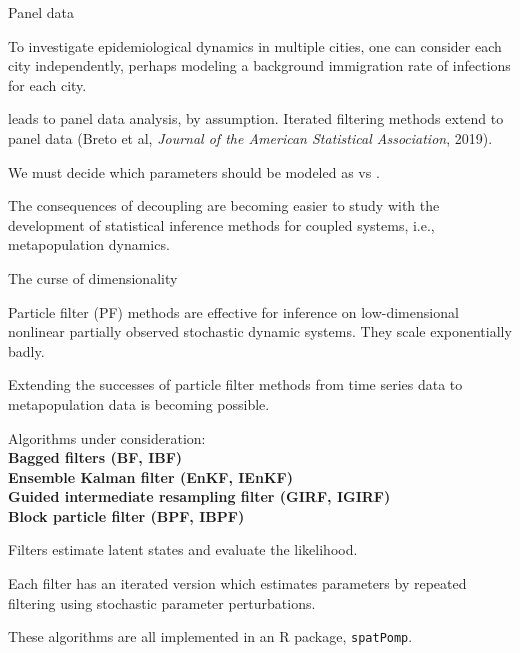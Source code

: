 \documentclass{beamer}
\begin{document}
\begin{frame}{Panel data}

\bi
\item To investigate epidemiological dynamics in multiple cities, one can consider each city independently, perhaps modeling a background immigration rate of infections for each city.

\item {} leads to panel data analysis, by assumption. Iterated filtering methods extend to panel data (Breto et al, {\it Journal of the American Statistical Association}, 2019).

\item We must decide which parameters should be modeled as  vs .

\item The consequences of decoupling are becoming easier to study with the development of statistical inference methods for coupled systems, i.e., metapopulation dynamics.

  \ei

  \end{frame}

\begin{frame}{The curse of dimensionality}

  \bi
  \item
    Particle filter (PF) methods are effective for inference on low-dimensional nonlinear partially observed stochastic dynamic systems. They scale exponentially badly.

\item Extending the successes of particle filter methods from time series data to metapopulation data is becoming possible.

\item Algorithms under consideration:\\
  {\bf
  Bagged filters (BF, IBF)\\
  Ensemble Kalman filter (EnKF, IEnKF)\\
  Guided intermediate resampling filter (GIRF, IGIRF)\\
  Block particle filter (BPF, IBPF)\\
  }
  
\item Filters estimate latent states and evaluate the likelihood.
\item Each filter has an iterated version which estimates parameters by repeated filtering using stochastic parameter perturbations.

\item These algorithms are all implemented in an R package, \texttt{spatPomp}.
  
  \ei
  
\end{frame}
\end{document}
